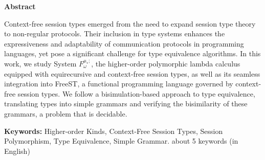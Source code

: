 \vspace*{2cm}
\begin{center}
\Large \bf Abstract
\end{center}
\vspace*{1cm} \setlength{\baselineskip}{0.6cm}

Context-free session types emerged from the need to expand session type theory to non-regular protocols. Their inclusion in type systems enhances the expressiveness and adaptability of communication protocols in programming languages, yet pose a significant challenge for type equivalence algorithms. In this work, we study System $F^{\mu_*;}_\omega$, the higher-order polymorphic lambda calculus equipped with equirecursive and context-free session types, as well as its seamless integration into FreeST, a functional programming language governed by context-free session types.
We follow a bisimulation-based approach to type equivalence, translating types into simple grammars and verifying the bisimilarity of these grammars, a problem that is decidable.



\vfill

\begin{flushleft}
\textbf{Keywords:}
Higher-order Kinds, Context-Free Session Types, Session Polymorphism, Type Equivalence, Simple Grammar.
about 5 keywords (in English)
\end{flushleft}

\LIMPA
{}
